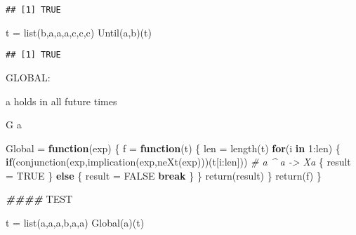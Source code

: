 \documentclass[
]{article}
\newenvironment{Shaded}{\begin{snugshade}}{\end{snugshade}}
\newcommand{\AlertTok}[1]{\textcolor[rgb]{0.94,0.16,0.16}{#1}}
\newcommand{\CommentTok}[1]{\textcolor[rgb]{0.56,0.35,0.01}{\textit{#1}}}
\newcommand{\ConstantTok}[1]{\textcolor[rgb]{0.00,0.00,0.00}{#1}}
\newcommand{\ControlFlowTok}[1]{\textcolor[rgb]{0.13,0.29,0.53}{\textbf{#1}}}
\newcommand{\DecValTok}[1]{\textcolor[rgb]{0.00,0.00,0.81}{#1}}
\newcommand{\DocumentationTok}[1]{\textcolor[rgb]{0.56,0.35,0.01}{\textbf{\textit{#1}}}}
\newcommand{\FunctionTok}[1]{\textcolor[rgb]{0.00,0.00,0.00}{#1}}
\newcommand{\NormalTok}[1]{#1}
\newcommand{\OtherTok}[1]{\textcolor[rgb]{0.56,0.35,0.01}{#1}}
\newcommand{\SpecialCharTok}[1]{\textcolor[rgb]{0.00,0.00,0.00}{#1}}
\newcommand{\StringTok}[1]{\textcolor[rgb]{0.31,0.60,0.02}{#1}}
\begin{document}
\begin{verbatim}
## [1] TRUE
\end{verbatim}

\begin{Shaded}
\begin{Highlighting}[]
\NormalTok{t }\OtherTok{=} \FunctionTok{list}\NormalTok{(}\StringTok{\textquotesingle{}b\textquotesingle{}}\NormalTok{,}\StringTok{\textquotesingle{}a\textquotesingle{}}\NormalTok{,}\StringTok{\textquotesingle{}a\textquotesingle{}}\NormalTok{,}\StringTok{\textquotesingle{}a\textquotesingle{}}\NormalTok{,}\StringTok{\textquotesingle{}c\textquotesingle{}}\NormalTok{,}\StringTok{\textquotesingle{}c\textquotesingle{}}\NormalTok{,}\StringTok{\textquotesingle{}c\textquotesingle{}}\NormalTok{)}
\FunctionTok{Until}\NormalTok{(a,b)(t)}
\end{Highlighting}
\end{Shaded}

\begin{verbatim}
## [1] TRUE
\end{verbatim}

GLOBAL:

a holds in all future times

G a

\begin{Shaded}
\begin{Highlighting}[]
\NormalTok{Global }\OtherTok{=} \ControlFlowTok{function}\NormalTok{(exp)}
\NormalTok{\{}
\NormalTok{  f }\OtherTok{=} \ControlFlowTok{function}\NormalTok{(t)}
\NormalTok{  \{}
\NormalTok{    len }\OtherTok{=} \FunctionTok{length}\NormalTok{(t)}
    \ControlFlowTok{for}\NormalTok{(i }\ControlFlowTok{in} \DecValTok{1}\SpecialCharTok{:}\NormalTok{len)}
\NormalTok{    \{}
      \ControlFlowTok{if}\NormalTok{(}\FunctionTok{conjunction}\NormalTok{(exp,}\FunctionTok{implication}\NormalTok{(exp,}\FunctionTok{neXt}\NormalTok{(exp)))(t[i}\SpecialCharTok{:}\NormalTok{len])) }\CommentTok{\# a \^{} a {-}\textgreater{} Xa}
\NormalTok{      \{}
\NormalTok{          result }\OtherTok{=} \ConstantTok{TRUE}
\NormalTok{      \}}
      \ControlFlowTok{else} 
\NormalTok{      \{}
\NormalTok{          result }\OtherTok{=} \ConstantTok{FALSE} 
          \ControlFlowTok{break} 
\NormalTok{      \}}
\NormalTok{    \}}
    \FunctionTok{return}\NormalTok{(result)}
\NormalTok{  \}}
  \FunctionTok{return}\NormalTok{(f)}
\NormalTok{\}}

\DocumentationTok{\#\#\#\# }\AlertTok{TEST}\DocumentationTok{ }

\NormalTok{t }\OtherTok{=} \FunctionTok{list}\NormalTok{(}\StringTok{\textquotesingle{}a\textquotesingle{}}\NormalTok{,}\StringTok{\textquotesingle{}a\textquotesingle{}}\NormalTok{,}\StringTok{\textquotesingle{}a\textquotesingle{}}\NormalTok{,}\StringTok{\textquotesingle{}b\textquotesingle{}}\NormalTok{,}\StringTok{\textquotesingle{}a\textquotesingle{}}\NormalTok{,}\StringTok{\textquotesingle{}a\textquotesingle{}}\NormalTok{)}
\FunctionTok{Global}\NormalTok{(a)(t)}
\end{Highlighting}
\end{Shaded}
\end{document}
